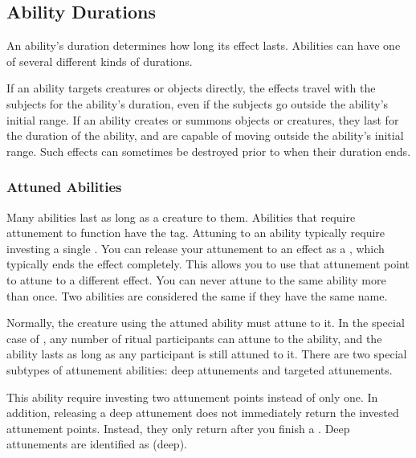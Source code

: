   \subsection{Ability Durations}\label{Ability Durations}

    An ability's duration determines how long its effect lasts.
    Abilities can have one of several different kinds of durations.

    If an ability targets creatures or objects directly, the effects travel with the subjects for the ability's duration, even if the subjects go outside the ability's initial range.
    If an ability creates or summons objects or creatures, they last for the duration of the ability, and are capable of moving outside the ability's initial range.
    Such effects can sometimes be destroyed prior to when their duration ends.

    \subsubsection{Attuned Abilities}\label{Attuned Abilities}
      Many abilities last as long as a creature  to them.
      Abilities that require attunement to function have the  tag.
      Attuning to an ability typically require investing a single .
      You can release your attunement to an effect as a , which typically ends the effect completely.
      This allows you to use that attunement point to attune to a different effect.
      You can never attune to the same ability more than once.
      Two abilities are considered the same if they have the same name.

      Normally, the creature using the attuned ability must attune to it.
      In the special case of , any number of ritual participants can attune to the ability, and the ability lasts as long as any participant is still attuned to it.
      There are two special subtypes of attunement abilities: deep attunements and targeted attunements.

       This ability require investing two attunement points instead of only one.
      In addition, releasing a deep attunement does not immediately return the invested attunement points.
      Instead, they only return after you finish a .
      Deep attunements are identified as  (deep).

